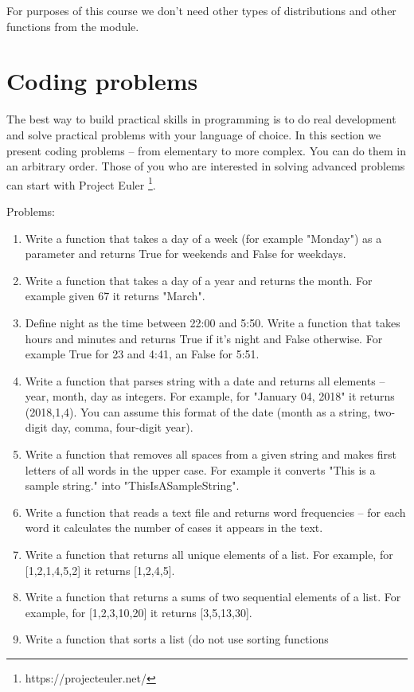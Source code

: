 For purposes of this course we don't need other types of 
distributions and other functions from the module.

\section{Coding problems}

The best way to build practical skills in programming is to do
real development and solve practical problems with your language
of choice. In this section we present coding problems -- from elementary
to more complex. You can do them in an arbitrary order. Those of
you who are interested in solving advanced problems can start 
with Project Euler \footnote{https://projecteuler.net/}.

Problems:

\begin{enumerate}
\item Write a function that takes a day of a week (for example "Monday")
as a parameter and returns True for weekends and False for weekdays.
\item Write a function that takes a day of a year and returns 
the month. For example given 67 it returns "March".
\item Define night as the time between 22:00 and 5:50. 
Write a function that takes hours and minutes and returns True if
it's night and False otherwise. For example True for 23 and 4:41, 
an False for 5:51.
\item Write a function that parses string with a date and returns
all elements -- year, month, day as integers. For example, for
"January 04, 2018" it returns (2018,1,4). You can assume this format of
the date (month as a string, two-digit day, comma, four-digit year).
\item Write a function that removes all spaces from a given string
and makes first letters of all words in the upper case. For example
it converts "This is a sample string." into "ThisIsASampleString".
\item Write a function that reads a text file and returns word frequencies 
-- for each word it calculates the number of cases it appears in the
text.
\item Write a function that returns all unique elements of a list. 
For example, for [1,2,1,4,5,2] it returns [1,2,4,5].
\item Write a function that returns a sums of two sequential elements of
a list. For example, for [1,2,3,10,20] it returns [3,5,13,30]. 
\item Write a function that sorts a list (do not use sorting functions 

\end{enumerate}

